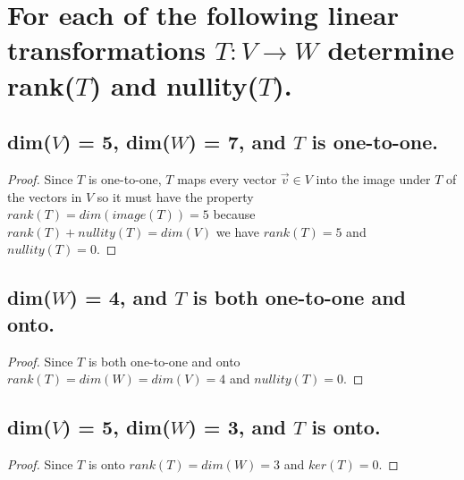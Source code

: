 \documentclass[../main.tex]{subfiles}
\begin{document}
\section[Problem 1]{For each of the following linear transformations $T: V \to W$ determine rank($T$) and nullity($T$).}
\subsection{dim($V$) = 5, dim($W$) = 7, and $T$ is one-to-one.}
\begin{proof}
        Since $T$ is one-to-one, $T$ maps every vector $\displaystyle \vec{v} \in V$ into the image under $T$ of the vectors in $V$ so it must have the property $rank(T)=dim(image(T))=5$ because $rank(T)+nullity(T)=dim(V)$ we have $rank(T)=5$ and $nullity(T)=0$.
\end{proof}

\subsection{dim($W$) = 4, and $T$ is both one-to-one and onto.}
\begin{proof}
        Since $\displaystyle T$ is both one-to-one and onto $\displaystyle rank( T) =dim( W) =dim( V) =4$ and $\displaystyle nullity( T) =0$.
\end{proof}
\subsection{dim($V$) = 5, dim($W$) = 3, and $T$ is onto.}
\begin{proof}
        Since $\displaystyle T$ is onto $\displaystyle rank( T) =dim( W) =3$ and $\displaystyle ker( T) =0$.
\end{proof}
\end{document}
